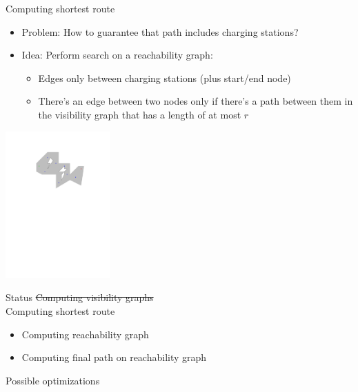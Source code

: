 \begin{frame}{Computing shortest route}

\begin{itemize}
\item Problem: How to guarantee that path includes charging stations?
\pause
\item Idea: Perform search on a reachability graph:
    \begin{itemize}
        \item Edges only between charging stations (plus start/end node)
        \item There's an edge between two nodes only if there's a path between them in the visibility graph that has a length of at most $r$
    \end{itemize}
\end{itemize}
\vspace{-2em}
\pause
\begin{center}
\includegraphics[page=10,height=160pt]{graphics/algo_basic.pdf}
\end{center}

\end{frame}

\begin{frame}{Status}
\sout{Computing visibility graphs}
\\[2em]
Computing shortest route
\begin{itemize}
    \item Computing reachability graph
    \item Computing final path on reachability graph
\end{itemize}
\vspace{2em}
Possible optimizations
\end{frame}


